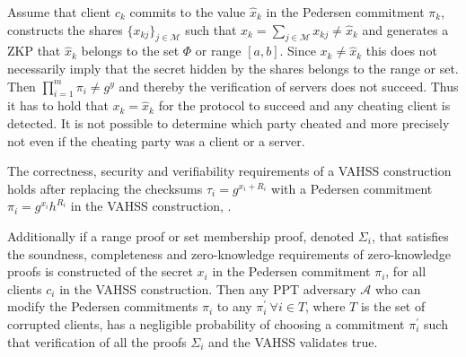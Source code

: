 Assume that client $c_k$ commits to the value $\hat{x}_k$ in the Pedersen commitment $\pi_k$, constructs the shares $\{x_{kj}\}_{j\in\mathcal{M}}$ such that $x_k = \sum_{j\in\mathcal{M}}x_{kj} \neq \hat{x}_k$ and  generates a ZKP that $\hat{x}_k$ belongs to the set $\Phi$ or range $[a,b]$. Since $x_k\neq\hat{x}_k$ this does not necessarily imply that  the secret hidden by the shares belongs to the range or set. Then  $\prod_{i=1}^m \pi_i \neq g^y$  and thereby the verification of servers does not succeed. Thus it has to hold that $x_k= \hat{x}_k$ for the protocol to succeed and any cheating client is detected. It is not possible to determine which party cheated and more precisely not even if the cheating party was a client or a server. 

\begin{Remark}
\label{thm:VAHSS_RP_CSV}
\vspace{10pt}
The correctness, security and verifiability requirements of a VAHSS construction holds after replacing the checksums $\tau_i= g^{x_i+R_i}$ with a Pedersen commitment $\pi_i= g^{x_i}h^{R_i}$ in the VAHSS construction, \cite{SumItUp}. 

Additionally if a range proof or set membership proof, denoted $\Sigma_i$, that satisfies the soundness, completeness and zero-knowledge requirements of zero-knowledge proofs is constructed of the secret $x_i$ in the Pedersen commitment $\pi_i$, for all clients $c_i$ in the VAHSS construction. Then any PPT adversary $\mathcal{A}$ who can modify the Pedersen commitments $\pi_i$  to any $\pi_i^{'} \:\forall  i\in T$, where $T$ is the set of corrupted clients, has a negligible probability of choosing a commitment $\pi_i^{'}$ such that verification of all the proofs $\Sigma_i$ and the VAHSS validates true.
\end{Remark}
